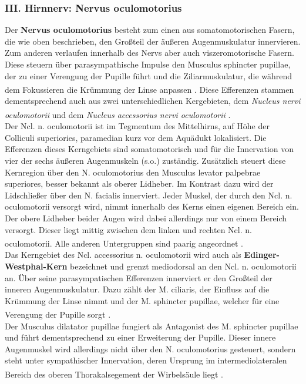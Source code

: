 \subsubsection*{III. Hirnnerv: Nervus oculomotorius} 
Der \textbf{Nervus oculomotorius} besteht zum einen aus somatomotorischen Fasern, die wie oben beschrieben, den Großteil der äußeren Augenmuskulatur innervieren. Zum anderen verlaufen innerhalb des Nervs aber auch viszeromotorische Fasern. Diese steuern über parasympathische Impulse den Musculus sphincter pupillae, der zu einer Verengung der Pupille führt und die Ziliarmuskulatur, die während dem Fokussieren die Krümmung der Linse anpassen \textsuperscript{\cite[Kap.~39]{kandel2013principles}}. Diese Efferenzen stammen dementsprechend auch aus zwei unterschiedlichen Kergebieten, dem \textit{Nucleus nervi oculomotorii}   und dem \textit{Nucleus accessorius nervi oculomotorii}  \textsuperscript{\cite[Kap.~5]{trepel2011neuroanatomie}}. \\  
Der Ncl. n. oculomotorii ist im Tegmentum des Mittelhirns, auf Höhe der Colliculi superiories, paramedian kurz vor dem Aquädukt lokalisiert. Die Efferenzen dieses Kerngebiets sind somatomotorisch und für die Innervation von vier der sechs äußeren Augenmuskeln (s.o.) zuständig. Zusätzlich steuert diese Kernregion über den N. oculomotorius den Musculus levator palpebrae superiores, besser bekannt als oberer Lidheber. Im Kontrast dazu wird der Lidschließer über den N. facialis innerviert. Jeder Muskel, der durch den Ncl. n. oculomotorii versorgt wird, nimmt innerhalb des Kerns einen eigenen Bereich ein. Der obere Lidheber beider Augen wird dabei allerdings nur von einem Bereich versorgt. Dieser liegt mittig zwischen dem linken und rechten Ncl. n. oculomotorii. Alle anderen Untergruppen sind paarig angeordnet \textsuperscript{\cite[Kap.~5]{trepel2011neuroanatomie}}. \\
Das Kerngebiet des Ncl. accessorius n. oculomotorii wird auch als \textbf{Edinger-Westphal-Kern} bezeichnet und grenzt mediodorsal an den Ncl. n. oculomotorii an. Über seine parasympatischen Efferenzen innerviert er den Großteil der inneren Augenmuskulatur. Dazu zählt der M. ciliaris, der Einfluss auf die Krümmung der Linse nimmt und der M. sphincter pupillae, welcher für eine Verengung der Pupille sorgt \textsuperscript{\cite[Kap.~5]{trepel2011neuroanatomie}}. \\          
Der Musculus dilatator pupillae fungiert als Antagonist des M. sphincter pupillae und führt dementsprechend zu einer Erweiterung der Pupille. Dieser innere Augenmuskel wird allerdings nicht über den N. oculomotorius gesteuert, sondern steht unter sympathischer Innervation, deren Ursprung im intermediolateralen Bereich des oberen Thorakalsegement der Wirbelsäule liegt \textsuperscript{\cite[Kap.~39]{kandel2013principles}}.

